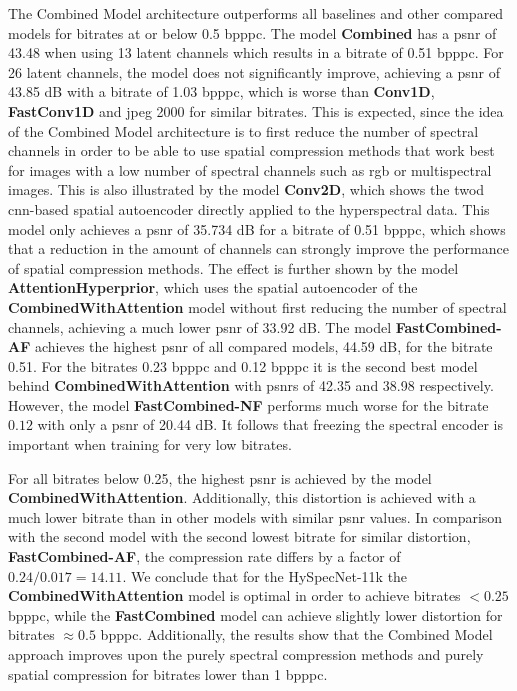 The Combined Model architecture outperforms all baselines and other compared models for bitrates at or below 0.5 \ac{bpppc}. The model \textbf{Combined} has a \ac{psnr} of 43.48 when using 13 latent channels which results in a bitrate of 0.51 \ac{bpppc}. For 26 latent channels, the model does not significantly improve, achieving a \ac{psnr} of 43.85 dB with a bitrate of 1.03 \ac{bpppc}, which is worse than \textbf{Conv1D}, \textbf{FastConv1D} and \ac{jpeg} 2000 for similar bitrates. This is expected, since the idea of the Combined Model architecture is to first reduce the number of spectral channels in order to be able to use spatial compression methods that work best for images with a low number of spectral channels such as \ac{rgb} or multispectral images. This is also illustrated by the model \textbf{Conv2D}, which shows the \ac{twod} \ac{cnn}-based spatial autoencoder directly applied to the hyperspectral data. This model only achieves a \ac{psnr} of 35.734 dB for a bitrate of 0.51 \ac{bpppc}, which shows that a reduction in the amount of channels can strongly improve the performance of spatial compression methods. The effect is further shown by the model \textbf{AttentionHyperprior}, which uses the spatial autoencoder of the \textbf{CombinedWithAttention} model without first reducing the number of spectral channels, achieving a much lower \ac{psnr} of 33.92 dB. The model \textbf{FastCombined-AF} achieves the highest \ac{psnr} of all compared models, 44.59 dB, for the bitrate 0.51. For the bitrates 0.23 \ac{bpppc} and 0.12 \ac{bpppc} it is the second best model behind \textbf{CombinedWithAttention} with \acp{psnr} of 42.35 and 38.98 respectively. However, the model \textbf{FastCombined-NF} performs much worse for the bitrate $0.12$ with only a \ac{psnr} of 20.44 dB. It follows that freezing the spectral encoder is important when training for very low bitrates.

For all bitrates below 0.25, the highest \ac{psnr} is achieved by the model \textbf{CombinedWithAttention}. Additionally, this distortion is achieved with a much lower bitrate than in other models with similar \ac{psnr} values. In comparison with the second model with the second lowest bitrate for similar distortion, \textbf{FastCombined-AF}, the compression rate differs by a factor of $0.24/0.017=14.11$. We conclude that for the HySpecNet-11k the \textbf{CombinedWithAttention} model is optimal in order to achieve bitrates $<0.25$ \ac{bpppc}, while the \textbf{FastCombined} model can achieve slightly lower distortion for bitrates $\approx 0.5$ \ac{bpppc}. Additionally, the results show that the Combined Model approach improves upon the purely spectral compression methods and purely spatial compression for bitrates lower than 1 \ac{bpppc}. 





